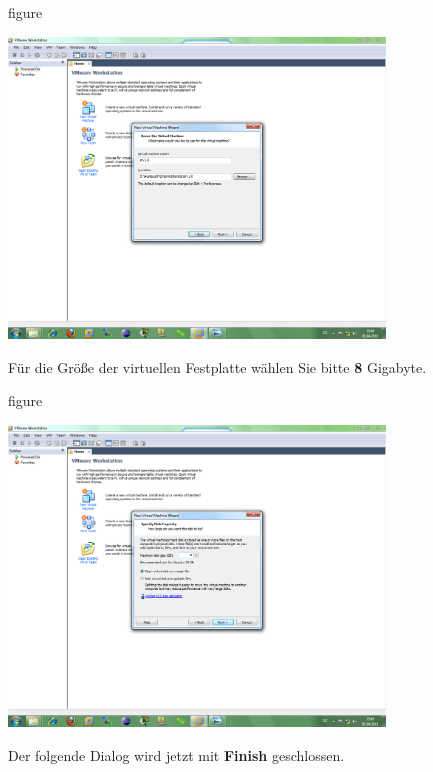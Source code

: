 \begin{nofloat}{figure}
\begin{center}
\includegraphics[width=0.75\textwidth]{screenshots/vm05.png}
\end{center}
\end{nofloat}

Für die Größe der virtuellen Festplatte wählen Sie bitte \textbf{8} Gigabyte.

\begin{nofloat}{figure}
\begin{center}
\includegraphics[width=0.75\textwidth]{screenshots/vm06.png}
\end{center}
\end{nofloat}

Der folgende Dialog wird jetzt mit \textbf{Finish} geschlossen.

